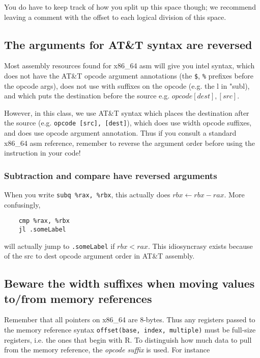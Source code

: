 \documentclass[11pt]{article}
\begin{document}
You do have to keep track of how you split up this space though; we recommend leaving a
comment with the offset to each logical division of this space.

\subsection{The arguments for AT\&T syntax are reversed}

Most assembly resources found for x86\_64 asm will give you intel syntax, which does not
have the AT\&T opcode argument annotations (the \texttt{\$}, \texttt{\%} prefixes before the
opcode args), does not use with suffixes on the opcode (e.g. the l in "subl),
and which puts the destination before the source e.g. $opcode [dest], [src]$.

However, in this class, we use AT\&T syntax which places the destination after the source
(e.g. \texttt{opcode [src], [dest]}), which does use width opcode suffixes, and does use opcode
argument annotation. Thus if you consult a standard x86\_64 asm reference, remember to
reverse the argument order before using the instruction in your code!

\subsubsection{Subtraction and compare have reversed arguments}

When you write \texttt{subq \%rax, \%rbx}, this actually does $rbx \leftarrow rbx - rax$. More
confusingly,

\begin{lstlisting}
    cmp %rax, %rbx
    jl .someLabel
\end{lstlisting}

will actually jump to \texttt{.someLabel} if $rbx < rax$. This idiosyncrasy exists because
of the src to dest opcode argument order in AT\&T assembly.

\subsection{Beware the width suffixes when moving values to/from memory references}

Remember that all pointers on x86\_64 are 8-bytes. Thus any registers passed to the memory
reference syntax \texttt{offset(base, index, multiple)} must be full-size registers, i.e.
the ones that begin with R. To distinguish how much data to pull from the memory
reference, the \emph{opcode suffix} is used. For instance
\end{document}
